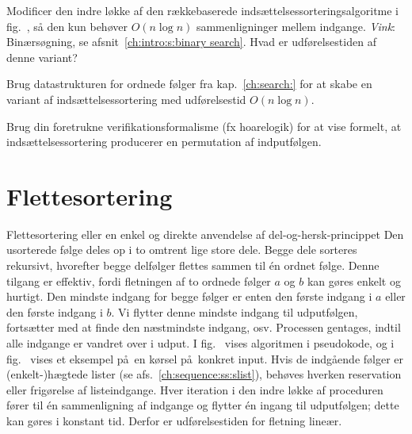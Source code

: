 \begin{exerc}
  Modificer den indre løkke af den rækkebaserede indsættelsessorteringsalgoritme i fig.~, så den kun behøver $O(n\log n)$ sammenligninger mellem indgange. 
  \emph{Vink}: Binærsøgning, se afsnit~\ref{ch:intro:s:binary search}.
  Hvad er udførelsestiden af denne variant?    
\end{exerc}

\begin{exerc}
  Brug datastrukturen for ordnede følger fra kap.~\ref{ch:search:} for at skabe en variant af indsættelsessortering med udførelsestid $O(n\log n)$. 
\end{exerc}

\begin{exerc}
  Brug din foretrukne verifikationsformalisme (fx hoarelogik) for at vise formelt, at indsættelsessortering producerer en permutation af indputfølgen.
\end{exerc}

\section{Flettesortering}
%
%
%

Flettesortering eller en enkel og direkte anvendelse af del-og-hersk-princippet
Den usorterede følge deles op i to omtrent lige store dele.
Begge dele sorteres rekursivt, hvorefter begge delfølger flettes sammen til én ordnet følge.
Denne tilgang er effektiv, fordi fletningen af to ordnede følger $a$ og $b$ kan gøres enkelt og hurtigt.
Den mindste indgang for begge følger er enten den første indgang i $a$ eller den første indgang i $b$.
Vi flytter denne mindste indgang til udputfølgen, fortsætter med at finde den næstmindste indgang, osv.
Processen gentages, indtil alle indgange er vandret over i udput.
I fig.~ vises algoritmen i pseudokode, og i fig.~ vises et eksempel på en kørsel på konkret input.
Hvis de indgående følger er (enkelt-)hægtede lister (se afs.~\ref{ch:sequence:ss:slist}), behøves hverken reservation eller frigørelse af listeindgange.
Hver iteration i den indre løkke af proceduren  fører til én sammenligning af indgange og flytter én ingang til udputfølgen; dette kan gøres i konstant tid.
Derfor er udførelsestiden for fletning lineær.

